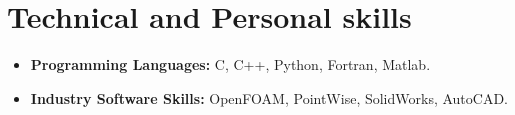 \documentclass[12pt,letter]{article}
\begin{document}
\section{Technical and Personal skills}

\vspace{6pt}

\begin{itemize}
\vspace{6pt}
\item \textbf{Programming Languages:} C, C++, Python, Fortran, Matlab.
\vspace{6pt}
\item \textbf{Industry Software Skills:} OpenFOAM, PointWise, SolidWorks, AutoCAD.
\end{itemize}
\end{document}
